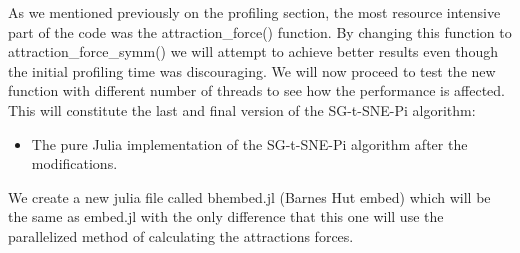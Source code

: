 As we mentioned previously on the profiling section, the most resource intensive part
of the code was the attraction\_force() function. By changing this function to attraction\_force\_symm()
we will attempt to achieve better results even though the initial profiling time was discouraging. 
We will now proceed to test the new function with different number of threads to see how the
performance is affected. This will constitute the last and final version of the SG-t-SNE-Pi algorithm:
\begin{itemize}
    \item The pure Julia implementation of the SG-t-SNE-Pi algorithm after the modifications.
\end{itemize}

We create a new julia file called bhembed.jl (Barnes Hut embed) which will be the same as embed.jl 
with the only difference that this one will use the parallelized method of calculating the attractions forces.
